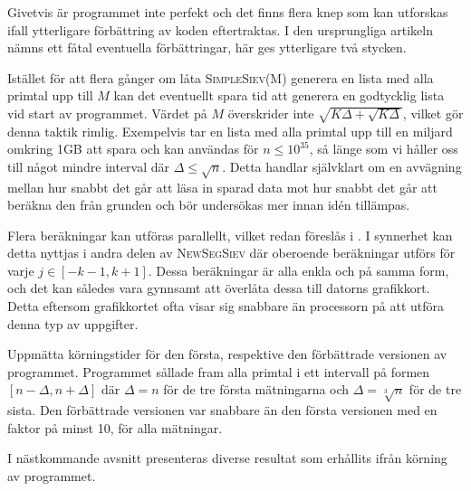 Givetvis är programmet inte perfekt och det finns flera knep som kan utforskas ifall ytterligare förbättring av koden eftertraktas.
I den ursprungliga artikeln \cite{HaraldSieve} nämns ett fåtal eventuella förbättringar, här ges ytterligare två stycken.
\begin{myitemize}
    \item
    Istället för att flera gånger om låta \textsc{SimpleSiev(M)} generera en lista med alla primtal upp till $M$ kan det eventuellt spara tid att generera en godtycklig lista vid start av programmet.
    Värdet på $M$ överskrider inte $\sqrt{K\Delta+\sqrt{K\Delta}}$, vilket gör denna taktik rimlig.
    Exempelvis tar en lista med alla primtal upp till en miljard omkring 1GB att spara och kan användas för $n\leq 10^{35}$, så länge som vi håller oss till något mindre interval där $\Delta\leq\sqrt{n}$.
    Detta handlar självklart om en avvägning mellan hur snabbt det går att läsa in sparad data mot hur snabbt det går att beräkna den från grunden och bör undersökas mer innan idén tillämpas.
    \item
    Flera beräkningar kan utföras parallellt, vilket redan föreslås i \cite{HaraldSieve}. 
    I synnerhet kan detta nyttjas i andra delen av \textsc{NewSegSiev} där oberoende beräkningar utförs för varje $j\in[-k-1,k+1]$.
    Dessa beräkningar är alla enkla och på samma form, och det kan således vara gynnsamt att överlåta dessa till datorns grafikkort.
    Detta eftersom grafikkortet ofta visar sig snabbare än processorn på att utföra denna typ av uppgifter.
\end{myitemize}
\begin{table}[h]
\centering
\caption{
Uppmätta körningstider för den första, respektive den förbättrade versionen av programmet.
Programmet sållade fram alla primtal i ett intervall på formen $[n-\Delta,n+\Delta]$ där $\Delta=n$ för de tre första mätningarna och $\Delta=\sqrt[3]{n}$ för de tre sista.
Den förbättrade versionen var snabbare än den första versionen med en faktor på minst 10, för alla mätningar.}

\label{implementering.tidtabell}
\end{table}

I nästkommande avsnitt presenteras diverse resultat som erhållits ifrån körning av programmet.



